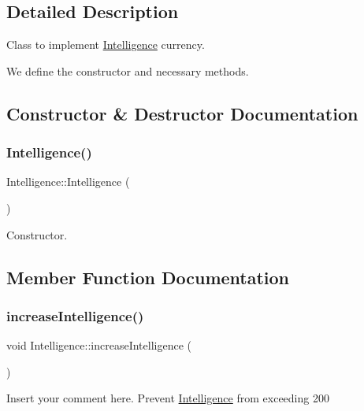 \subsection{Detailed Description}
Class to implement \hyperlink{classIntelligence}{Intelligence} currency. 

We define the constructor and necessary methods. 

\subsection{Constructor \& Destructor Documentation}
\mbox{\label{classIntelligence_a146fc36901bb5993c71b0d9426439fea}} 
\subsubsection{\texorpdfstring{Intelligence()}{Intelligence()}}
{\footnotesize\ttfamily Intelligence\+::\+Intelligence (\begin{DoxyParamCaption}{ }\end{DoxyParamCaption})}

Constructor. 

\subsection{Member Function Documentation}
\mbox{\label{classIntelligence_ad822db7ef4eef6c1f797f65c73fec3f0}} 
\subsubsection{\texorpdfstring{increase\+Intelligence()}{increaseIntelligence()}}
{\footnotesize\ttfamily void Intelligence\+::increase\+Intelligence (\begin{DoxyParamCaption}{ }\end{DoxyParamCaption})}

Insert your comment here. Prevent \hyperlink{classIntelligence}{Intelligence} from exceeding 200 \mbox{\label{classIntelligence_a7a85f46b0628c2c018a729a15f78b322}} 

